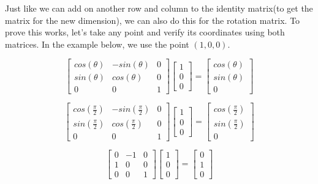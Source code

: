 \documentclass[14pt]{article}
\begin{document}
Just like we can add on another row and column to the identity matrix(to get the matrix for the new dimension), we can also do this for the rotation matrix. To prove this works, let's take any point and verify its coordinates using both matrices. In the example below, we use the point $(1, 0, 0)$.

\vspace*{1em}

\begin{equation}
	\begin{bmatrix}
	cos(\theta) & -sin(\theta) & 0 \\
	sin(\theta) & cos(\theta) & 0 \\ 
	0 & 0 & 1
	\end{bmatrix}
	\begin{bmatrix}
	1 \\
	0 \\ 
	0
	\end{bmatrix}	
	=
	\begin{bmatrix}
	cos(\theta) \\
	sin(\theta) \\ 
	0
	\end{bmatrix}
\end{equation}

\vspace*{1em}

\begin{equation}
	\begin{bmatrix}
	cos(\frac{\pi}{2}) & -sin(\frac{\pi}{2}) & 0 \\
	sin(\frac{\pi}{2}) & cos(\frac{\pi}{2}) & 0 \\ 
	0 & 0 & 1
	\end{bmatrix}
	\begin{bmatrix}
	1 \\
	0 \\ 
	0
	\end{bmatrix}	
	=
	\begin{bmatrix}
	cos(\frac{\pi}{2}) \\
	sin(\frac{\pi}{2}) \\ 
	0
	\end{bmatrix}
\end{equation}

\vspace*{1em}

\begin{equation}
	\begin{bmatrix}
	0 & -1 & 0 \\
	1 & 0 & 0 \\ 
	0 & 0 & 1
	\end{bmatrix}
	\begin{bmatrix}
	1 \\
	0 \\ 
	0
	\end{bmatrix}	
	=
	\begin{bmatrix}
	0 \\
	1 \\ 
	0
	\end{bmatrix}
\end{equation}
\end{document}
